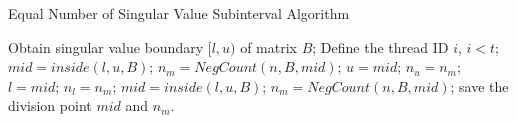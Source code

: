 \begin{algorithm}
\caption{Equal Number of Singular Value Subinterval Algorithm}
\label{alg:numsub}
\begin{algorithmic}[1]
  \State Obtain singular value boundary $[l,u)$ of matrix $B$;
  \State Define the thread ID $i$, $i<t$;
  \State $mid = inside(l, u, B)$;
  \State $n_m = NegCount(n, B, mid)$;
      \State $u=mid$;
      \State $n_u=n_m$;
    \Else
      \State $l=mid$;
      \State $n_l=n_m$;
    \EndIf
    \State $mid = inside(l, u, B)$;
    \State $n_m = NegCount(n, B, mid)$;
  \EndWhile
  \State save the division point $mid$ and $n_m$.
\EndProcedure
\end{algorithmic}
\end{algorithm}
